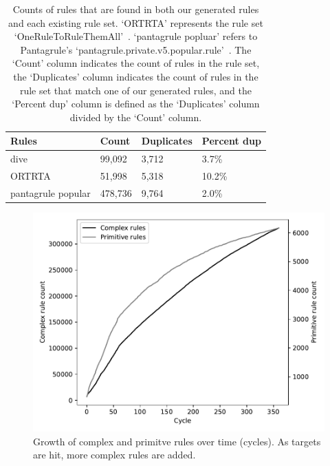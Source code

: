 \documentclass[letterpaper,twocolumn,10pt]{article}
\begin{document}
\begin{table}
\centering
\begin{tabular}{|l|l|l|l|}
    \hline
    Rules & Count & Duplicates & Percent dup \\
    \hline
    dive & 99,092& 3,712 & 3.7\% \\
    ORTRTA & 51,998 & 5,318 & 10.2\% \\
    pantagrule popular & 478,736 & 9,764 & 2.0\% \\
    \hline
\end{tabular}
\caption{Counts of rules that are found in both our generated rules and each existing rule set. `ORTRTA' represents the rule set `OneRuleToRuleThemAll'~\cite{ortrta}. `pantagrule popluar' refers to Pantagrule's `pantagrule.private.v5.popular.rule'~\cite{pantagrule}. The `Count' column indicates the count of rules in the rule set, the `Duplicates' column indicates the count of rules in the rule set that match one of our generated rules, and the `Percent dup' column is defined as the `Duplicates' column divided by the `Count' column.}
\label{tab:dups}
\end{table}


\begin{figure}
\includegraphics[width=\linewidth]
{analysis/passwords-analysis/stats-rules_composites_size.pdf}
\caption{Growth of complex and primitve rules over time (cycles). As targets
are hit, more complex rules are added. }
\label{fig:rule-count}
\end{figure}
\end{document}
